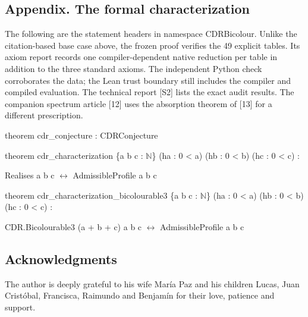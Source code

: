 \documentclass[english,11pt,a4paper]{article}
\begin{document}
\subsection{Appendix. The formal characterization}\label{appendix.-the-formal-characterization}

The following are the statement headers in namespace CDRBicolour. Unlike the citation-based base case above, the frozen proof verifies the 49 explicit tables. Its axiom report records one compiler-dependent native reduction per table in addition to the three standard axioms. The independent Python check corroborates the data; the Lean trust boundary still includes the compiler and compiled evaluation. The technical report {[}S2{]} lists the exact audit results. The companion spectrum article {[}12{]} uses the absorption theorem of {[}13{]} for a different prescription.

\begingroup\small\ttfamily\raggedright 
\noindent\hspace*{0.0em}theorem cdr\_\allowbreak{}conjecture : CDRConjecture\par
\noindent\hspace*{0.0em}\par
\noindent\hspace*{0.0em}theorem cdr\_\allowbreak{}characterization \{a b c : \(\mathbb N\)\} (ha : 0 < a) (hb : 0 < b) (hc : 0 < c) :\par
\noindent\hspace*{1.8em}Realises a b c \(\leftrightarrow\) AdmissibleProfile a b c\par
\noindent\hspace*{0.0em}\par
\noindent\hspace*{0.0em}theorem cdr\_\allowbreak{}characterization\_\allowbreak{}bicolourable3 \{a b c : \(\mathbb N\)\} (ha : 0 < a) (hb : 0 < b) (hc : 0 < c) :\par
\noindent\hspace*{1.8em}CDR.Bicolourable3 (a + b + c) a b c \(\leftrightarrow\) AdmissibleProfile a b c\par\endgroup

\subsection{Acknowledgments}\label{acknowledgments}

The author is deeply grateful to his wife María Paz and his children Lucas, Juan Cristóbal, Francisca, Raimundo and Benjamín for their love, patience and support.
\end{document}
